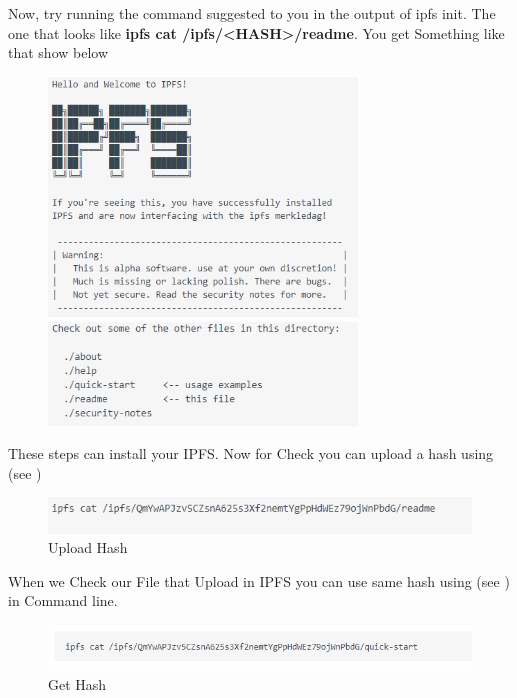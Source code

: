 Now, try running the command suggested to you in the output of ipfs init. The one that looks like \textbf{ipfs cat /ipfs/<HASH>/readme}.
You get Something like that show below
\begin{figure}[h]
	\centering
	\includegraphics[width=310px]{figures/IPFS/06.png}
	\includegraphics[width=310px]{figures/IPFS/09.png}
\end{figure}
\newpage
These steps can install your IPFS. Now for Check you can upload a hash using  (see )

\begin{figure}[h]
	\centering
	\includegraphics[width=450px]{figures/IPFS/07.png}
	\caption{Upload Hash}
	\label{fig:ipfs7}
\end{figure}

When we Check our File that Upload in IPFS you can use same hash using (see ) in Command line.
\begin{figure}[h]
	\centering
	\includegraphics[width=450px]{figures/IPFS/08.png}
	\caption{Get Hash}
	\label{fig:ipfs8}
\end{figure}